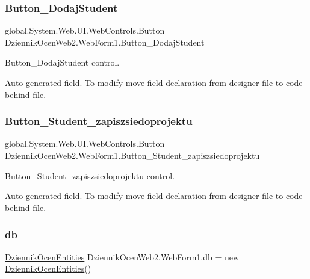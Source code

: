 \subsubsection{\texorpdfstring{Button\+\_\+\+Dodaj\+Student}{Button\_DodajStudent}}
{\footnotesize\ttfamily global.\+System.\+Web.\+U\+I.\+Web\+Controls.\+Button Dziennik\+Ocen\+Web2.\+Web\+Form1.\+Button\+\_\+\+Dodaj\+Student\hspace{0.3cm}{\ttfamily [protected]}}



Button\+\_\+\+Dodaj\+Student control. 

Auto-\/generated field. To modify move field declaration from designer file to code-\/behind file. \mbox{\label{class_dziennik_ocen_web2_1_1_web_form1_aa90a53487f082ae6c9124c782abd0678}} 
\subsubsection{\texorpdfstring{Button\+\_\+\+Student\+\_\+zapiszsiedoprojektu}{Button\_Student\_zapiszsiedoprojektu}}
{\footnotesize\ttfamily global.\+System.\+Web.\+U\+I.\+Web\+Controls.\+Button Dziennik\+Ocen\+Web2.\+Web\+Form1.\+Button\+\_\+\+Student\+\_\+zapiszsiedoprojektu\hspace{0.3cm}{\ttfamily [protected]}}



Button\+\_\+\+Student\+\_\+zapiszsiedoprojektu control. 

Auto-\/generated field. To modify move field declaration from designer file to code-\/behind file. \mbox{\label{class_dziennik_ocen_web2_1_1_web_form1_a8247555bffb3698fe1d03a15b2253840}} 
\subsubsection{\texorpdfstring{db}{db}}
{\footnotesize\ttfamily \hyperlink{class_dziennik_ocen_web2_1_1_dziennik_ocen_entities}{Dziennik\+Ocen\+Entities} Dziennik\+Ocen\+Web2.\+Web\+Form1.\+db = new \hyperlink{class_dziennik_ocen_web2_1_1_dziennik_ocen_entities}{Dziennik\+Ocen\+Entities}()\hspace{0.3cm}{\ttfamily [private]}}

